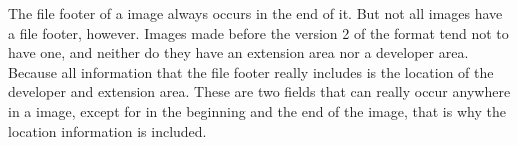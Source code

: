 \begin{refsection}
  The file footer of a \tga image always occurs in the end of it. But
  not all \tga images have a file footer, however. Images made before
  the version 2 of the \tga format tend not to have one, and neither
  do they have an extension area nor a developer area. Because all
  information that the file footer really includes is the location of
  the developer and extension area. These are two fields that can
  really occur anywhere in a \tga image, except for in the beginning
  and the end of the image, that is why the location information is
  included.

  \printbibliography[heading=subbibliography]

\end{refsection}